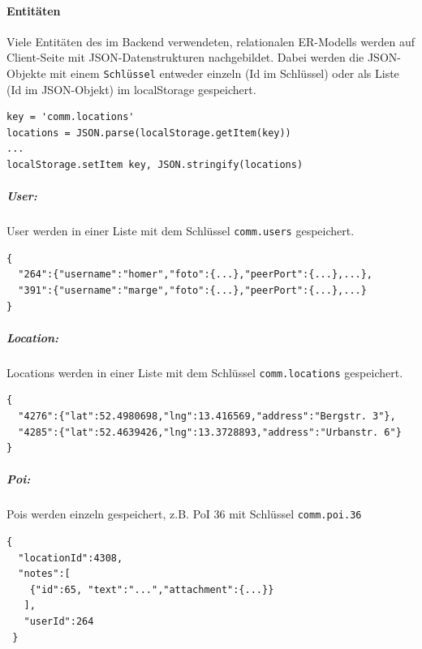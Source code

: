 \paragraph{Entitäten}
Viele Entitäten des im Backend verwendeten, relationalen ER-Modells werden auf Client-Seite mit JSON-Datenstrukturen nachgebildet. Dabei werden die JSON-Objekte mit einem \texttt{Schlüssel} entweder einzeln (Id im Schlüssel) oder als Liste (Id im JSON-Objekt) im localStorage gespeichert.
\lstset{language=JavaScript}
\begin{lstlisting}[frame=single,xleftmargin=0pt,numbers=none,caption={Lesen und Speichern von JSON-Objekten mit localStorage},captionpos=b]
key = 'comm.locations'
locations = JSON.parse(localStorage.getItem(key))
...
localStorage.setItem key, JSON.stringify(locations)
\end{lstlisting}

\subparagraph{User:}
User werden in einer Liste mit dem Schlüssel \texttt{comm.users} gespeichert.
\lstset{language=JavaScript}
\begin{lstlisting}[frame=single,xleftmargin=0pt,numbers=none,caption={users.json},captionpos=b]
{
  "264":{"username":"homer","foto":{...},"peerPort":{...},...},
  "391":{"username":"marge","foto":{...},"peerPort":{...},...}
}
\end{lstlisting}

\subparagraph{Location:}
Locations werden in einer Liste mit dem Schlüssel \texttt{comm.locations} gespeichert.
\lstset{language=JavaScript}
\begin{lstlisting}[frame=single,xleftmargin=0pt,numbers=none,caption={locations.json},captionpos=b]
{
  "4276":{"lat":52.4980698,"lng":13.416569,"address":"Bergstr. 3"},
  "4285":{"lat":52.4639426,"lng":13.3728893,"address":"Urbanstr. 6"}
}
\end{lstlisting}

\subparagraph{Poi:}
Pois werden einzeln gespeichert, z.B. PoI 36 mit Schlüssel \texttt{comm.poi.36}
\lstset{language=JavaScript}
\begin{lstlisting}[frame=single,xleftmargin=0pt,numbers=none,caption={poi.json},captionpos=b]
{
  "locationId":4308,
  "notes":[
    {"id":65, "text":"...","attachment":{...}}
   ],
   "userId":264
 }
\end{lstlisting}

